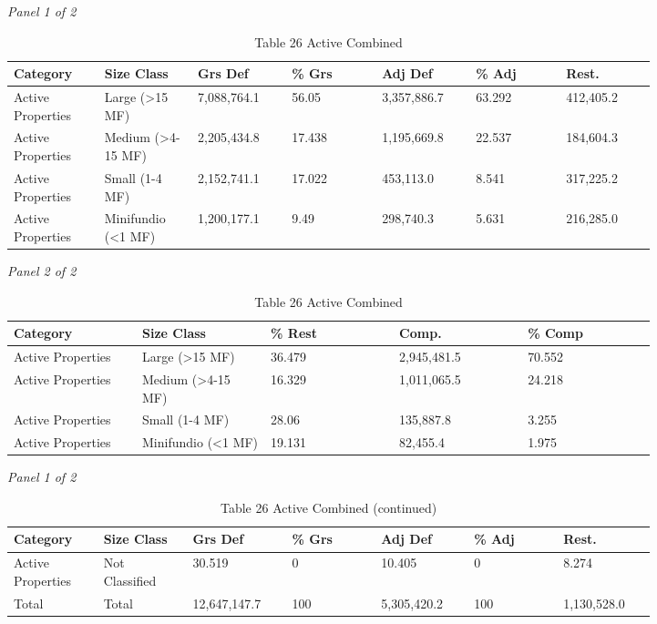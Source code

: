 \documentclass[12pt]{article}
\begin{document}
\begin{landscape}
\begin{table}[H]
\centering
\caption{Table 26 Active Combined}
\textit{Panel 1 of 2}\\[2pt]
{\fontsize{12}{14}\selectfont
\setlength{\tabcolsep}{3pt}
\renewcommand{\arraystretch}{1.08}
\begin{tabular}{p{0.117\linewidth}p{0.117\linewidth}p{0.117\linewidth}p{0.117\linewidth}p{0.117\linewidth}p{0.117\linewidth}p{0.117\linewidth}}
\toprule
Category & Size Class & Grs Def & \% Grs & Adj Def & \% Adj & Rest. \\
\midrule
Active Properties & Large (>15 MF) & 7,088,764.1 & 56.05 & 3,357,886.7 & 63.292 & 412,405.2 \\
Active Properties & Medium (>4-15 MF) & 2,205,434.8 & 17.438 & 1,195,669.8 & 22.537 & 184,604.3 \\
Active Properties & Small (1-4 MF) & 2,152,741.1 & 17.022 & 453,113.0 & 8.541 & 317,225.2 \\
Active Properties & Minifundio (<1 MF) & 1,200,177.1 & 9.49 & 298,740.3 & 5.631 & 216,285.0 \\
\bottomrule
\end{tabular}
}

\vspace{0.6em}

\textit{Panel 2 of 2}\\[2pt]
{\fontsize{12}{14}\selectfont
\setlength{\tabcolsep}{3pt}
\renewcommand{\arraystretch}{1.08}
\begin{tabular}{p{0.164\linewidth}p{0.164\linewidth}p{0.164\linewidth}p{0.164\linewidth}p{0.164\linewidth}}
\toprule
Category & Size Class & \% Rest & Comp. & \% Comp \\
\midrule
Active Properties & Large (>15 MF) & 36.479 & 2,945,481.5 & 70.552 \\
Active Properties & Medium (>4-15 MF) & 16.329 & 1,011,065.5 & 24.218 \\
Active Properties & Small (1-4 MF) & 28.06 & 135,887.8 & 3.255 \\
Active Properties & Minifundio (<1 MF) & 19.131 & 82,455.4 & 1.975 \\
\bottomrule
\end{tabular}
}
\end{table}
\begin{table}[H]
\centering
\caption{Table 26 Active Combined (continued)}
\textit{Panel 1 of 2}\\[2pt]
{\fontsize{12}{14}\selectfont
\setlength{\tabcolsep}{3pt}
\renewcommand{\arraystretch}{1.08}
\begin{tabular}{p{0.117\linewidth}p{0.117\linewidth}p{0.117\linewidth}p{0.117\linewidth}p{0.117\linewidth}p{0.117\linewidth}p{0.117\linewidth}}
\toprule
Category & Size Class & Grs Def & \% Grs & Adj Def & \% Adj & Rest. \\
\midrule
Active Properties & Not Classified & 30.519 & 0 & 10.405 & 0 & 8.274 \\
Total & Total & 12,647,147.7 & 100 & 5,305,420.2 & 100 & 1,130,528.0 \\
\bottomrule
\end{tabular}
}


\end{table}
\end{landscape}
\end{document}
